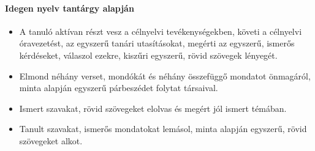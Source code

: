 \paragraph{Idegen nyelv tantárgy alapján}
\begin{itemize}
\item A tanuló aktívan részt vesz a célnyelvi tevékenységekben, követi a célnyelvi óravezetést, az egyszerű tanári utasításokat, megérti az egyszerű, ismerős kérdéseket, válaszol ezekre, kiszűri egyszerű, rövid szövegek lényegét.
\item Elmond néhány verset, mondókát és néhány összefüggő mondatot önmagáról, minta alapján egyszerű párbeszédet folytat társaival.
\item Ismert szavakat, rövid szövegeket elolvas és megért jól ismert témában.
\item Tanult szavakat, ismerős mondatokat lemásol, minta alapján egyszerű, rövid szövegeket alkot.
\end{itemize}
